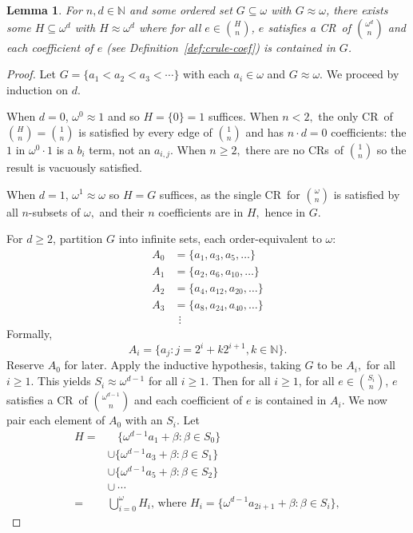 \documentclass[11pt]{article}
\newcommand{\om}{\omega}
\newcommand{\oequiv}{\approx}
\newcommand{\N}{\mathbb{N}}
\newcommand{\crulenospace}{CR}
\newcommand{\crule}{\crulenospace~}
\newcommand{\crules}{\crulenospace s~}
\newcommand{\numpoints}{n}
\newcommand{\inumpoints}{i}
\newcommand{\commonconst}{a}
\newcommand{\Commonconst}{A}
\theoremstyle{plain}
\newtheorem{lemma}[theorem]{Lemma}
\theoremstyle{definition}
\begin{document}
\begin{lemma}
\label{le:bend-nats}
For $\numpoints, d \in \N$ and some ordered set
$G \subseteq \om$ with $G \oequiv \om$, there exists some $H \subseteq \om^d$ with $H \oequiv \om^d$ where for all $e \in \binom{H}{\numpoints}$, $e$ satisfies a \crule of $\binom{\om^d}{\numpoints}$ and each coefficient of $e$ (see Definition~\ref{def:crule-coef}) is contained in $G$.
\end{lemma}
\begin{proof}
Let $G = \{
\commonconst_1 < \commonconst_2 < \commonconst_3 < \cdots\}$ with each
$\commonconst_{\inumpoints} \in \om$ and $G \oequiv \om$. We proceed by induction on $d$.

When $d=0$, $\om^0 \oequiv 1$ and so $H = \{0\} = 1$ suffices. When $n < 2,$
the only \crule of $\binom{H}{n} = \binom{1}{n}$ is satisfied by every edge
of $\binom{1}{n}$ and has $n \cdot d = 0$ coefficients:
the $1$ in $\om^0 \cdot 1$ is a $b_i$
term, not an $a_{i,j}.$
When $n\geq 2,$ there are no \crules of $\binom{1}{n}$ so the result
is vacuously satisfied.

When $d=1$, $\om^1 \oequiv \om$ so $H=G$ suffices, as the single \crule for $\binom{\om}{n}$
is satisfied by all $n$-subsets of $\om,$ and their $n$ coefficients are in $H,$ hence in $G.$

For $d \geq 2$, partition $G %
$ into infinite sets, each order-equivalent to $\om$: \begin{align*}
A_0 & = \{\commonconst_1,\commonconst_3,\commonconst_5,\ldots\}\\
A_1 & = \{\commonconst_2,\commonconst_6,\commonconst_{10},\ldots\}\\
A_2 & = \{\commonconst_4,\commonconst_{12},\commonconst_{20},\ldots\}\\
A_3 & = \{\commonconst_8,\commonconst_{24},\commonconst_{40},\ldots\}\\
& ~~\vdots
\end{align*}
Formally, $$
\Commonconst_i = \{\commonconst_j \colon j = 2^i + k2^{i+1}, k \in \N \}.
$$
Reserve $\Commonconst_0$ for later. Apply the inductive hypothesis, taking $G$ to be $\Commonconst_i,$ for all $i \geq 1$. This yields $S_i \oequiv \om^{d-1}$ for all $i \geq 1$. Then for all $i \geq 1$, for all $e \in \binom{S_i}{\numpoints}$, $e$ satisfies a \crule of $\binom{\om^{d-1}}{\numpoints}$ and each coefficient of $e$ is contained in $\Commonconst_i$. We now pair each element of $\Commonconst_0$ with an $S_i.$ Let \begin{align*}
H = & ~~~~\!\{\om^{d-1}\commonconst_{1} + \beta : \beta \in S_0\} \\
 & \cup \{\om^{d-1}\commonconst_{3} + \beta : \beta \in S_1\} \\
 & \cup \{\om^{d-1}\commonconst_{5} + \beta : \beta \in S_2 \}\\
& \cup ~\cdots\\
= & \bigcup_{i = 0}^\omega H_i\text{, where } H_i=
\{\om^{d-1}\commonconst_{2i+1} + \beta : \beta \in S_i\},
\end{align*}


\end{proof}
\end{document}
